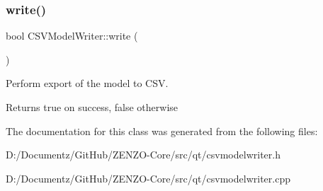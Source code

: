 \subsubsection{\texorpdfstring{write()}{write()}}
{\footnotesize\ttfamily bool C\+S\+V\+Model\+Writer\+::write (\begin{DoxyParamCaption}{ }\end{DoxyParamCaption})}

Perform export of the model to C\+SV. \begin{DoxyReturn}{Returns}
true on success, false otherwise 
\end{DoxyReturn}


The documentation for this class was generated from the following files\+:\begin{DoxyCompactItemize}
\item 
D\+:/\+Documentz/\+Git\+Hub/\+Z\+E\+N\+Z\+O-\/\+Core/src/qt/csvmodelwriter.\+h\item 
D\+:/\+Documentz/\+Git\+Hub/\+Z\+E\+N\+Z\+O-\/\+Core/src/qt/csvmodelwriter.\+cpp\end{DoxyCompactItemize}
